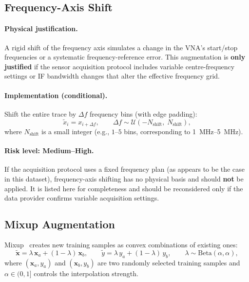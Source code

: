\subsection{Frequency-Axis Shift}
\label{sec:augment:freqshift}

\paragraph{Physical justification.}
A rigid shift of the frequency axis simulates a change in the VNA's
start/stop frequencies or a systematic frequency-reference error.  This
augmentation is \textbf{only justified} if the sensor acquisition
protocol includes variable centre-frequency settings or IF bandwidth
changes that alter the effective frequency grid.

\paragraph{Implementation (conditional).}
Shift the entire trace by $\Delta f$ frequency bins (with edge padding):
\begin{equation}
  \tilde{x}_i = x_{i + \Delta f},
  \qquad \Delta f \sim \mathcal{U}(-N_{\text{shift}},\;N_{\text{shift}}),
  \label{eq:freq_shift}
\end{equation}
where $N_{\text{shift}}$ is a small integer (e.g., $1$--$5$ bins,
corresponding to \SIrange{1}{5}{\mega\hertz}).

\paragraph{Risk level: \textbf{Medium--High}.}
If the acquisition protocol uses a fixed frequency plan (as appears to
be the case in this dataset), frequency-axis shifting has no physical
basis and should \textbf{not} be applied.  It is listed here for
completeness and should be reconsidered only if the data provider
confirms variable acquisition settings.

\subsection{Mixup Augmentation}
\label{sec:augment:mixup}

Mixup~\cite{zhang2018mixup} creates new training samples as convex
combinations of existing ones:
\begin{equation}
  \tilde{\mathbf{x}} = \lambda\,\mathbf{x}_a + (1-\lambda)\,\mathbf{x}_b,
  \qquad
  \tilde{y} = \lambda\,y_a + (1-\lambda)\,y_b,
  \qquad
  \lambda \sim \text{Beta}(\alpha,\alpha),
  \label{eq:mixup}
\end{equation}
where $(\mathbf{x}_a, y_a)$ and $(\mathbf{x}_b, y_b)$ are two
randomly selected training samples and $\alpha \in (0,1]$ controls the
interpolation strength.

